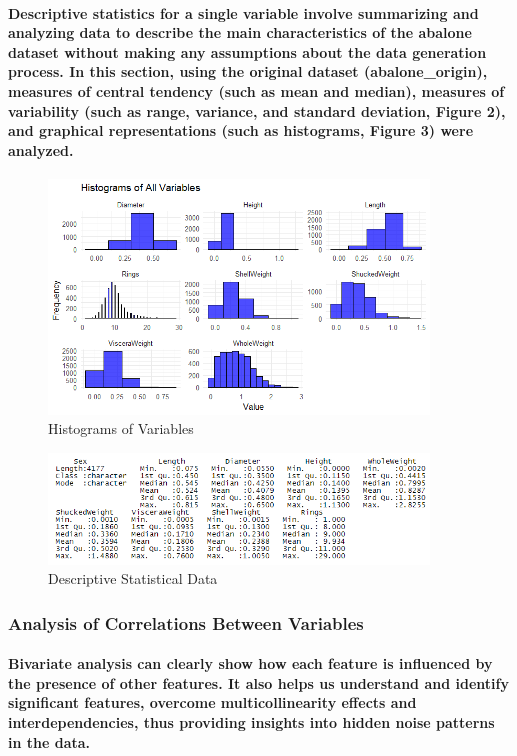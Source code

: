 \documentclass[11pt]{article} %
\begin{document}
\paragraph{Descriptive statistics for a single variable involve summarizing and analyzing data to describe the main characteristics of the abalone dataset without making any assumptions about the data generation process. In this section, using the original dataset (abalone\_origin), measures of central tendency (such as mean and median), measures of variability (such as range, variance, and standard deviation, Figure 2), and graphical representations (such as histograms, Figure 3) were analyzed.}
% 
% 
% 
\begin{figure}[H]
    \centering
    \includegraphics[width=0.9\textwidth]{Pic/Hist.png}
    \caption{Histograms of Variables}
\end{figure}
% 
% 
% 
\begin{figure}[H]
    \centering
    \includegraphics[width=0.9\textwidth]{Pic/discripstat.png}
    \caption{Descriptive Statistical Data}
\end{figure}
% 
% 
\subsubsection{Analysis of Correlations Between Variables}
\paragraph{Bivariate analysis can clearly show how each feature is influenced by the presence of other features. It also helps us understand and identify significant features, overcome multicollinearity effects and interdependencies, thus providing insights into hidden noise patterns in the data.}
\end{document}
